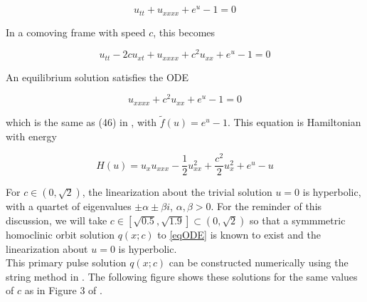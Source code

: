 \documentclass[12pt]{article}
\begin{document}
\begin{equation}\label{susp3}
u_{tt} + u_{xxxx} + e^{u} - 1 = 0
\end{equation}

In a comoving frame with speed $c$, this becomes

\begin{equation}\label{susp3}
u_{tt} - 2 c u_{x t} + u_{xxxx} + c^2 u_{xx} + e^{u} - 1 = 0
\end{equation}

An equilibrium solution satisfies the ODE

\begin{equation}\label{eqODE}
u_{xxxx} + c^2 u_{xx} + e^{u} - 1 = 0
\end{equation}

which is the same as (46) in \cite{Chen1997}, with $\tilde{f}(u) = e^u - 1$. This equation is Hamiltonian with energy

\begin{equation}\label{eqH}
H(u) = u_x u_{xxx} - \frac{1}{2}u_{xx}^2 + \frac{c^2}{2}u_x^2 + e^u - u
\end{equation}

For $c \in (0, \sqrt{2})$, the linearization about the trivial solution $u = 0$ is hyperbolic, with a quartet of eigenvalues $\pm \alpha \pm \beta i$, $\alpha, \beta > 0$. For the reminder of this discussion, we will take $c \in [\sqrt{0.5}, \sqrt{1.9}] \subset (0, \sqrt{2})$ so that a symmmetric homoclinic orbit solution $q(x; c)$ to \eqref{eqODE} is known to exist and the linearization about $u = 0$ is hyperbolic.\\

This primary pulse solution $q(x; c)$ can be constructed numerically using the string method in \cite{Chamard2011}. The following figure shows these solutions for the same values of $c$ as in Figure 3 of \cite{Chen1997}.
\end{document}
